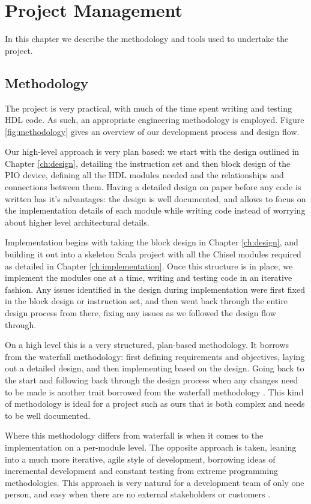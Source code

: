 \chapter{Project Management}

In this chapter we describe the methodology and tools used to undertake the project.

\section{Methodology}
The project is very practical, with much of the time spent writing and testing HDL code. As such, an appropriate engineering methodology is employed. Figure \ref{fig:methodology} gives an overview of our development process and design flow.

Our high-level approach is very plan based: we start with the design outlined in Chapter \ref{ch:design}, detailing the instruction set and then block design of the PIO device, defining all the HDL modules needed and the relationships and connections between them. Having a detailed design on paper before any code is written has it's advantages: the design is well documented, and allows to focus on the implementation details of each module while writing code instead of worrying about higher level architectural details.

Implementation begins with taking the block design in Chapter \ref{ch:design}, and building it out into a skeleton Scala project with all the Chisel modules required as detailed in Chapter \ref{ch:implementation}. Once this structure is in place, we implement the modules one at a time, writing and testing code in an iterative fashion. Any issues identified in the design during implementation were first fixed in the block design or instruction set, and then went back through the entire design process from there, fixing any issues as we followed the design flow through.

On a high level this is a very structured, plan-based methodology. It borrows from the waterfall methodology: first defining requirements and objectives, laying out a detailed design, and then implementing based on the design. Going back to the start and following back through the design process when any changes need to be made is another trait borrowed from the waterfall methodology \cite{softeng}. This kind of methodology is ideal for a project such as ours that is both complex and needs to be well documented.

Where this methodology differs from waterfall is when it comes to the implementation on a per-module level. The opposite approach is taken, leaning into a much more iterative, agile style of development, borrowing ideas of incremental development and constant testing from extreme programming methodologies. This approach is very natural for a development team of only one person, and easy when there are no external stakeholders or customers \cite{softeng}.

